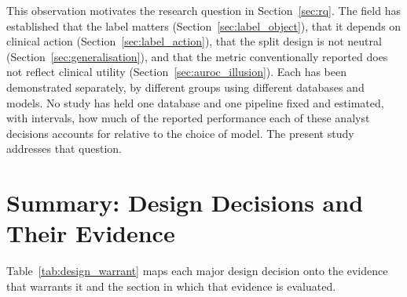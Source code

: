 This observation motivates the research question in Section~\ref{sec:rq}. The field has established that the label matters
(Section~\ref{sec:label_object}), that it depends on clinical action
(Section~\ref{sec:label_action}), that the split design is not neutral
(Section~\ref{sec:generalisation}), and that the metric conventionally reported
does not reflect clinical utility (Section~\ref{sec:auroc_illusion}). Each has
been demonstrated separately, by different groups using different databases
and models. No study has held one database and one pipeline fixed and
estimated, with intervals, how much of the reported performance each of these
analyst decisions accounts for relative to the choice of model. The present
study addresses that question.


\section{Summary: Design Decisions and Their Evidence}
\label{sec:design_warrant}

Table~\ref{tab:design_warrant} maps each major design decision onto the
evidence that warrants it and the section in which that evidence is evaluated.

